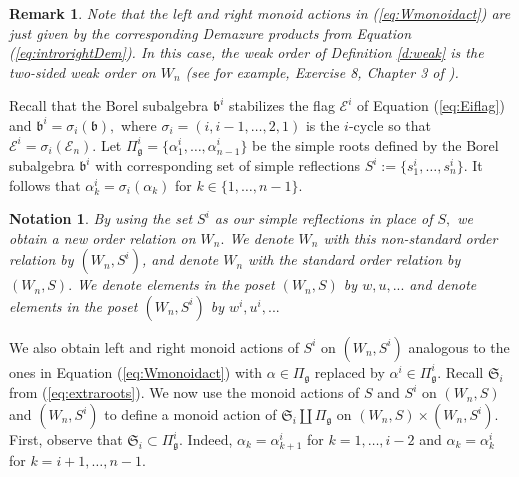\documentclass[12pt]{amsart}
\numberwithin{equation}{section}
\newtheorem{rem}[thm]{Remark}
\newtheorem{nota}[thm]{Notation}
\newcommand{\Wn}{{W}_n}
\newcommand{\fg}{\mbox{${\mathfrak g}$}}
\newcommand{\fb}{\mbox{${\mathfrak b}$}}
\begin{document}
\begin{rem}\label{r:Demazure}
 Note that the left and right monoid actions in (\ref{eq:Wmonoidact}) are just given by the corresponding Demazure products from Equation (\ref{eq:introrightDem}).  In this case, the weak order of Definition \ref{d:weak} is the two-sided weak order on $W_{n}$ (see for example, Exercise 8, Chapter 3 of \cite{BB}). 
\end{rem}


Recall that the Borel subalgebra $\fb^{i}$ stabilizes the flag $\mathcal{E}^{i}$ of Equation (\ref{eq:Eiflag}) and $\fb^{i}=\sigma_{i}(\fb),$ where $\sigma_{i}=(i,i-1,\dots, 2, 1)$ is the $i$-cycle so that $\mathcal{E}^{i}=\sigma_{i}(\mathcal{E}_{n})$.   Let $\Pi^{i}_{\fg}=\{\alpha_{1}^{i},\dots, \alpha_{n-1}^{i}\}$ be the simple roots defined by the Borel subalgebra $\fb^{i}$ with corresponding set of simple reflections $S^{i}:=\{s^{i}_{1},\dots, s^{i}_{n}\}$.  It follows that $\alpha^{i}_{k}=\sigma_{i}(\alpha_{k})$ for $k\in \{1,\dots, n-1\}$.
\begin{nota}\label{n:Worders}
 By using the set  $S^{i}$ as our simple reflections in place of  $S,$ we obtain a new order relation on $W_{n}.$  We denote $\Wn$ with this non-standard order relation by $(\Wn, S^{i})$, and denote $\Wn$ with the standard order relation by $(\Wn, S).$  We denote elements in the poset $(\Wn,S)$ by $w, u, ...$ and denote elements in the poset $(\Wn, S^{i})$ by
 $w^{i}, u^{i}, ...$
\end{nota}

We also obtain left and right monoid actions of $S^{i}$ on $(\Wn, S^{i})$  analogous to the ones in Equation (\ref{eq:Wmonoidact}) with $\alpha\in\Pi_{\fg}$ replaced by $\alpha^{i}\in \Pi_{\fg}^{i}$. Recall $\mathfrak{S}_i$ from (\ref{eq:extraroots}).
 We now use the monoid actions of $S$ and $S^{i}$ on $(\Wn,S)$ and $(\Wn,S^{i})$ to define a monoid action of $\mathfrak{S}_i\coprod\Pi_{\fg}$ on $(\Wn,S)\times (\Wn,S^{i})$.  First, observe that $\mathfrak{S}_i\subset\Pi_{\fg}^{i}$.  Indeed, $\alpha_{k}=\alpha_{k+1}^{i}$ for $k=1,\dots, i-2$ and $\alpha_{k}=\alpha_{k}^{i}$ for $k=i+1,\dots, n-1$.   %
\end{document}
